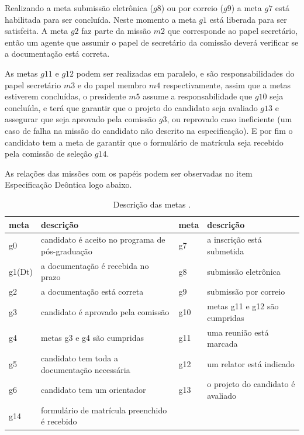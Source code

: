 \begin{itemize}
Realizando a meta submissão eletrônica ($g8$) ou por correio ($g9$) a meta $g7$ está habilitada para ser concluída. Neste momento a meta $g1$ está liberada para ser satisfeita. A meta $g2$ faz parte da missão $m2$ que corresponde ao papel secretário, então um agente que assumir o papel de secretário da comissão deverá verificar se a documentação está correta.

As metas $g11$ e $g12$ podem ser realizadas em paralelo, e são responsabilidades do papel secretário $m3$ e do papel membro $m4$ respectivamente, assim que a metas estiverem concluídas, o presidente $m5$ assume a responsabilidade que $g10$ seja concluída, e terá que garantir que o projeto do candidato seja avaliado $g13$ e assegurar que seja aprovado pela comissão $g3$, ou reprovado caso ineficiente (um caso de falha na missão do candidato não descrito na especificação). E por fim o candidato tem a meta de garantir que o formulário de matrícula seja recebido pela comissão de seleção $g14$.

As relações das missões com os papéis podem ser observadas no item Especificação Deôntica logo abaixo.

\begin{table}[ht]
\footnotesize
\centering
\caption{Descrição das metas \cite{hubner2003modelo}.}
\label{tab:desc_metas}
\begin{tabular}{@{}llll@{}}
\toprule
meta   & \multicolumn{1}{l|}{descrição}                                       & meta & descrição                         \\ \midrule
g0     & \multicolumn{1}{l|}{candidato é aceito no programa de pós-graduação} & g7   & a inscrição está submetida        \\
g1(Dt) & \multicolumn{1}{l|}{a documentação é recebida no prazo}              & g8   & submissão eletrônica              \\
g2     & \multicolumn{1}{l|}{a documentação está correta}                     & g9   & submissão por correio             \\
g3     & \multicolumn{1}{l|}{candidato é aprovado pela comissão}              & g10  & metas g11 e g12 são cumpridas          \\
g4     & \multicolumn{1}{l|}{metas g3 e g4 são cumpridas}                                                & g11  & uma reunião está marcada          \\
g5     & \multicolumn{1}{l|}{candidato tem toda a documentação necessária}    & g12  & um relator está indicado          \\
g6     & \multicolumn{1}{l|}{candidato tem um orientador}                     & g13  & o projeto do candidato é avaliado \\
g14    & formulário de matrícula preenchido é recebido                        &      &                                   \\ \bottomrule
\end{tabular}
\end{table}


\end{itemize}
